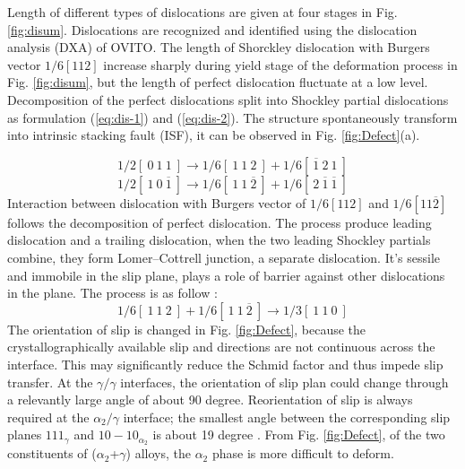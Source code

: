 \documentclass[Unknown,article,submit,moreauthors,pdftex,10pt,a4paper]{Definitions/mdpi}
\begin{document}
Length of different types of dislocations are given at four stages in Fig. \ref{fig:disum}. Dislocations are recognized and identified using the dislocation analysis (DXA) of OVITO. The length of Shorckley dislocation with Burgers vector $1/6[1 1 2]$ increase sharply during yield stage of the deformation process in Fig. \ref{fig:disum}, but the length of perfect dislocation fluctuate at a low level. Decomposition of the perfect  dislocations split into Shockley partial dislocations as formulation (\ref{eq:dis-1}) and (\ref{eq:dis-2}). The structure spontaneously transform into intrinsic stacking fault (ISF), it can be observed in Fig. \ref{fig:Defect}(a). 


\begin{equation}\label{eq:dis-1}
1/2 [\ 0\ 1\ 1\ ] \to 1/6[\ 1\ 1\ 2\ ]+1/6[\ \overline{1}\ 2\ 1\ ]
\end{equation}
\begin{equation}\label{eq:dis-2}
1/2 [\ 1\ 0\ \overline{1}\ ] \to 1/6 [\ 1\ 1\ \overline{2}\ ] + 1/6[\ 2\ \overline{1}\ \overline{1}\ ]
\end{equation}
Interaction between dislocation with Burgers vector of $1/6 [112] $ and $ 1/6 [11\overline{2}]$ follows the decomposition of perfect dislocation. The process produce leading dislocation and a trailing dislocation, when the two leading Shockley partials combine, they form Lomer–Cottrell junction, a separate dislocation. It's sessile and immobile in the slip plane, plays a role of barrier against other dislocations in the plane. The process is as follow :
\begin{equation}\label{eq:dis-3}
1/6 [\ 1\ 1\ 2\ ] + 1/6 [\ 1\ 1\  \overline{2}\ ] \to 1/3 [\ 1\ 1\ 0\ ]
\end{equation}
The orientation of slip is changed in Fig. \ref{fig:Defect}, because the crystallographically available slip and directions are not continuous across the interface. This may significantly reduce the Schmid factor and thus impede slip transfer. At the $\gamma/\gamma$ interfaces, the orientation of slip plan could change through a relevantly large angle of about 90 degree. Reorientation of slip is always required at the $\alpha_{2}/\gamma$ interface; the smallest angle between the corresponding slip planes ${1 1 1}_{\gamma}$ and ${ 1 0 -1 0}_{\alpha_2}$ is about 19 degree \cite{intro-structure}. From Fig. \ref{fig:Defect}, of the two constituents of ($\alpha_2$+$\gamma$) alloys, the $\alpha_2$ phase is more difficult to deform. 
\end{document}

